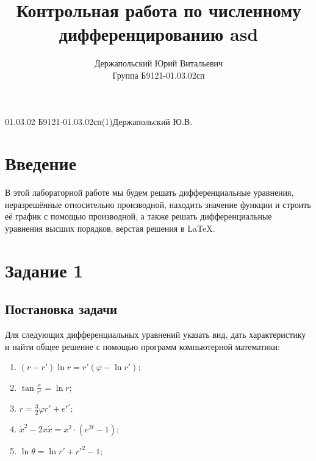 \documentclass[14pt, a4paper, titlepage, fleqn]{extarticle}
\title{Контрольная работа по численному дифференцированию asd }
\author{Держапольский Юрий Витальевич \\ Группа Б9121-01.03.02сп}
\date{}
\begin{document}
    {01.03.02 }{Б9121-01.03.02сп(1)}{Держапольский Ю.В.}
    
    \tableofcontents

    \pagebreak

    \section{Введение}
        В этой лабораторной работе мы будем решать дифференциальные 
        уравнения, неразрешённые относительно производной, находить значение
        функции и строить её график с помощью производной, 
        а также решать дифференциальные уравнения высших
        порядков, верстая решения в \LaTeX.

    \pagebreak

    \section{Задание 1}
        \subsection{Постановка задачи}
            Для следующих дифференциальных уравнений указать вид,
            дать характеристику и найти общее решение с помощью программ
            компьютерной математики:

            \begin{enumerate}
                \item \( (r-r') \ln{r} = r' \left( \varphi - \ln{r'} \right); \)
                \item \( \tan{\frac{r}{r'}} = \ln{r}; \)
                \item \( r = \frac{3}{2} \varphi r' + e^{r'}; \)
                \item \( \dot{x}^2 - 2x \dot{x} = x^2 \cdot \left( e^{2t} - 1 \right); \)
                \item \( \ln{\theta} = \ln{r'} + r'^2 - 1; \)
            \end{enumerate}

        
\end{document}
